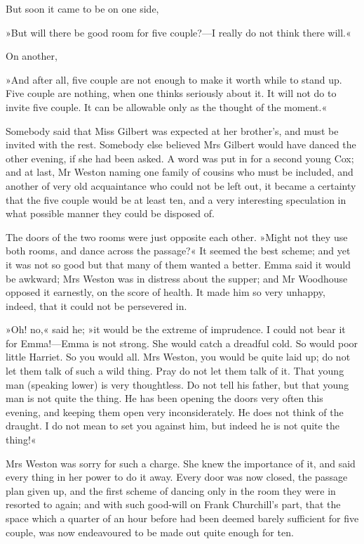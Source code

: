 But soon it came to be on one side,

»But will there be good room for five couple?—I really do not think there will.«

On another,

»And after all, five couple are not enough to make it worth while to stand up. Five couple are nothing, when one thinks seriously about it. It will not do to invite five couple. It can be allowable only as the thought of the moment.«

Somebody said that Miss Gilbert was expected at her brother's, and must be invited with the rest. Somebody else believed Mrs Gilbert would have danced the other evening, if she had been asked. A word was put in for a second young Cox; and at last, Mr Weston naming one family of cousins who must be included, and another of very old acquaintance who could not be left out, it became a certainty that the five couple would be at least ten, and a very interesting speculation in what possible manner they could be disposed of.

The doors of the two rooms were just opposite each other. »Might not they use both rooms, and dance across the passage?« It seemed the best scheme; and yet it was not so good but that many of them wanted a better. Emma said it would be awkward; Mrs Weston was in distress about the supper; and Mr Woodhouse opposed it earnestly, on the score of health. It made him so very unhappy, indeed, that it could not be persevered in.

»Oh! no,« said he; »it would be the extreme of imprudence. I could not bear it for Emma!—Emma is not strong. She would catch a dreadful cold. So would poor little Harriet. So you would all. Mrs Weston, you would be quite laid up; do not let them talk of such a wild thing. Pray do not let them talk of it. That young man (speaking lower) is very thoughtless. Do not tell his father, but that young man is not quite the thing. He has been opening the doors very often this evening, and keeping them open very inconsiderately. He does not think of the draught. I do not mean to set you against him, but indeed he is not quite the thing!«

Mrs Weston was sorry for such a charge. She knew the importance of it, and said every thing in her power to do it away. Every door was now closed, the passage plan given up, and the first scheme of dancing only in the room they were in resorted to again; and with such good-will on Frank Churchill's part, that the space which a quarter of an hour before had been deemed barely sufficient for five couple, was now endeavoured to be made out quite enough for ten.

